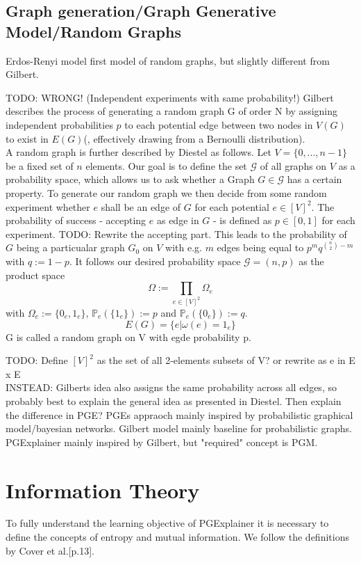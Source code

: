 \subsection{Graph generation/Graph Generative Model/Random Graphs}
Erdos-Renyi model first model of random graphs, but slightly different from Gilbert. \bigskip

TODO: WRONG! (Independent experiments with same probability!) Gilbert\cite{} describes the process of generating a random graph G of order N by assigning independent probabilities $p$ to each potential edge between two nodes in $V(G)$ to exist in $E(G)$(, effectively drawing from a Bernoulli distribution). \\
A random graph is further described by Diestel\cite{} as follows. Let $V = \{0,...,n-1\}$ be a fixed set of $n$ elements. Our goal is to define the set $\mathcal{G}$ of all graphs on $V$ as a probability space, which allows us to ask whether a Graph $G \in \mathcal{G}$ has a certain property. To generate our random graph we then decide from some random experiment whether $e$ shall be an edge of $G$ for each potential $e \in [V]^2$. The probability of success - accepting $e$ as edge in $G$ - is defined as $p \in [0,1]$ for each experiment. TODO: Rewrite the accepting part. This leads to the probability of $G$ being a particualar graph $G_0$ on $V$ with e.g. $m$ edges being equal to $p^m q^{\binom{n}{2}-m}$ with $q:=1-p$. It follows our desired probability space $\mathcal{G}=(n,p)$ as the product space
$$\Omega := \prod_{e \in [V]^2} \Omega_e$$ with $\Omega_e := \{0_e,1_e\}$, $\mathbb{P}_e(\{1_e\}) := p$ and $\mathbb{P}_e(\{0_e\}) := q$.
$$E(G) = \{e | \omega(e) = 1_e\}$$
G is called a random graph on V with egde probability p. \bigskip

TODO: Define $[V]^2$ as the set of all 2-elements subsets of V? or rewrite as e in E x E \\
INSTEAD: Gilberts idea also assigns the same probability across all edges, so probably best to explain the general idea as presented in Diestel. Then explain the difference in PGE? PGEs appraoch mainly inspired by probabilistic graphical model/bayesian networks. Gilbert model mainly baseline for probabilistic graphs. PGExplainer mainly inspired by Gilbert, but "required" concept is PGM.

\section{Information Theory}
To fully understand the learning objective of PGExplainer it is necessary to define the concepts of entropy and mutual information. We follow the definitions by Cover et al.\cite{Cover2005}[p.13].

